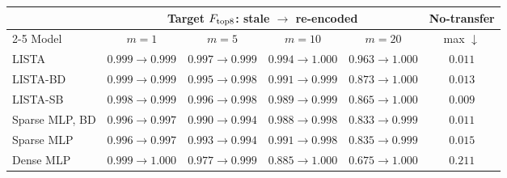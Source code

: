 \begin{tabular}{@{}lccccc@{}}
\toprule
& \multicolumn{4}{c}{Target \(F_{\rm top8}\): stale \(\to\) re-encoded} & No-transfer \\
\cmidrule(lr){2-5}
Model & \(m=1\) & \(m=5\) & \(m=10\) & \(m=20\) & max \(\downarrow\) \\
\midrule
LISTA & $0.999{\to}0.999$ & $0.997{\to}0.999$ & $0.994{\to}1.000$ & $0.963{\to}1.000$ & $0.011$ \\
LISTA-BD & $0.999{\to}0.999$ & $0.995{\to}0.998$ & $0.991{\to}0.999$ & $0.873{\to}1.000$ & $0.013$ \\
LISTA-SB & $0.998{\to}0.999$ & $0.996{\to}0.998$ & $0.989{\to}0.999$ & $0.865{\to}1.000$ & $0.009$ \\
Sparse MLP, BD & $0.996{\to}0.997$ & $0.990{\to}0.994$ & $0.988{\to}0.998$ & $0.833{\to}0.999$ & $0.011$ \\
Sparse MLP & $0.996{\to}0.997$ & $0.993{\to}0.994$ & $0.991{\to}0.998$ & $0.835{\to}0.999$ & $0.015$ \\
Dense MLP & $0.999{\to}1.000$ & $0.977{\to}0.999$ & $0.885{\to}1.000$ & $0.675{\to}1.000$ & $0.211$ \\
\bottomrule
\end{tabular}
